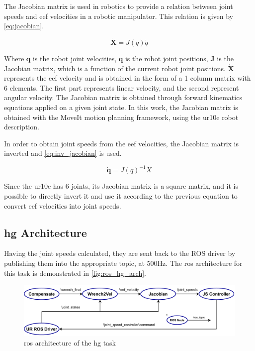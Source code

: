 \par The Jacobian matrix is used in robotics to provide a relation between joint speeds and \ac{eef} velocities in a robotic manipulator. This relation is given by \autoref{eq:jacobian}.

\begin{equation}
    \dot{\mathbf{X}} = J(q)\dot{q}
    \label{eq:jacobian}
\end{equation}

\noindent Where $\dot{\mathbf{q}}$ is the robot joint velocities, $\mathbf{q}$ is the robot joint positions, $\mathbf{J}$ is the Jacobian matrix, which is a function of the current robot joint positions. $\dot{\mathbf{X}}$ represents the \ac{eef} velocity and is obtained in the form of a 1 column matrix with 6 elements. The first part represents linear velocity, and the second represent angular velocity. The Jacobian matrix is obtained through forward kinematics equations applied on a given joint state. In this work, the Jacobian matrix is obtained with the MoveIt motion planning framework, using the \ac{ur10e} robot description. 

\par In order to obtain joint speeds from the \ac{eef} velocities, the Jacobian matrix is inverted and \autoref{eq:inv_jacobian} is used.

\begin{equation}
    \dot{\mathbf{q}} = J(q)^{-1} \dot{X}
    \label{eq:inv_jacobian}
\end{equation}

\noindent Since the \ac{ur10e} has 6 joints, its Jacobian matrix is a square matrix, and it is possible to directly invert it and use it according to the previous equation to convert \ac{eef} velocities into joint speeds.



\subsection{\ac{hg} Architecture}

\par Having the joint speeds calculated, they are sent back to the ROS driver by publishing them into the appropriate topic, at 500Hz. The \ac{ros} architecture for this task is demonstrated in \autoref{fig:ros_hg_arch}.

\begin{figure}[h]
    \centering
    \includegraphics[width=\linewidth]{figs/chp5/ros_hg_arch.pdf}
    \caption{\ac{ros} architecture of the \ac{hg} task}
    \label{fig:ros_hg_arch}
\end{figure}

